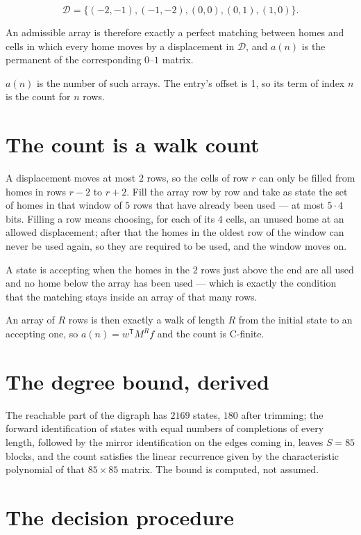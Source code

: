 \documentclass[11pt]{article}
\theoremstyle{definition}
\begin{document}
\[\mathcal{D} = \{(-2,-1), (-1,-2), (0,0), (0,1), (1,0)\}.\]

An admissible array is therefore exactly a perfect matching between homes and cells in which every home moves by a displacement in $\mathcal{D}$, and $a(n)$ is the permanent of the corresponding $0$--$1$ matrix.

$a(n)$ is the number of such arrays. The entry's offset is 1, so its term of index $n$ is the count for $n$ rows.

\section{The count is a walk count}

A displacement moves at most $2$ rows, so the cells of row $r$ can only be filled from homes in rows $r-2$ to $r+2$. Fill the array row by row and take as state the set of homes in that window of $5$ rows that have already been used --- at most $5\cdot4$ bits. Filling a row means choosing, for each of its $4$ cells, an unused home at an allowed displacement; after that the homes in the oldest row of the window can never be used again, so they are required to be used, and the window moves on.

A state is accepting when the homes in the $2$ rows just above the end are all used and no home below the array has been used --- which is exactly the condition that the matching stays inside an array of that many rows.

An array of $R$ rows is then exactly a walk of length $R$ from the initial state to an accepting one, so $a(n) = w^{\mathsf T}M^{R}f$ and the count is C-finite.

\section{The degree bound, derived}

The reachable part of the digraph has $2169$ states, $180$ after trimming; the forward identification of states with equal numbers of completions of every length, followed by the mirror identification on the edges coming in, leaves $S = 85$ blocks, and the count satisfies the linear recurrence given by the characteristic polynomial of that $85\times85$ matrix. The bound is computed, not assumed.

\section{The decision procedure}
\end{document}
